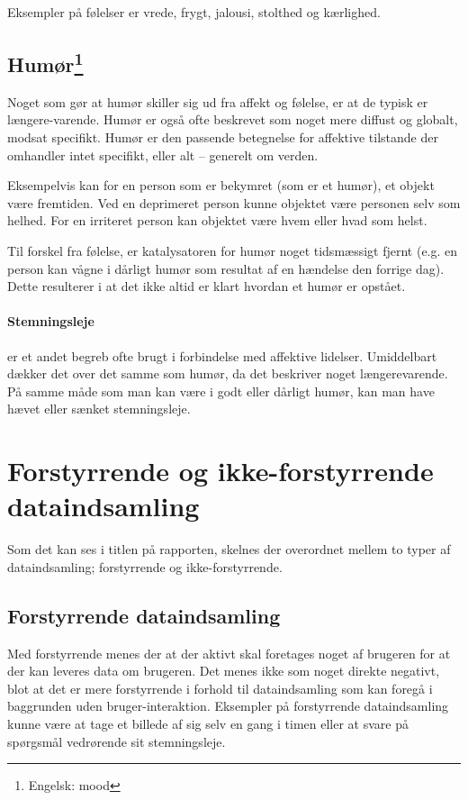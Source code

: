 Eksempler på følelser er vrede, frygt, jalousi, stolthed og kærlighed.\cite[p. 322]{ekkekakis}

\subsection[Humør]{Humør\footnote{Engelsk: mood}}
Noget som gør at humør skiller sig ud fra affekt og følelse, er at de typisk er længere-varende.
Humør er også ofte beskrevet som noget mere diffust og globalt, modsat specifikt.
Humør er den passende betegnelse for affektive tilstande der omhandler intet specifikt, eller alt -- generelt om verden.

Eksempelvis kan for en person som er bekymret (som er et humør), et objekt være fremtiden.
Ved en deprimeret person kunne objektet være personen selv som helhed.
For en irriteret person kan objektet være hvem eller hvad som helst.

Til forskel fra følelse, er katalysatoren for humør noget tidsmæssigt fjernt (e.g. en person kan vågne i dårligt humør som resultat af en hændelse den forrige dag).
Dette resulterer i at det ikke altid er klart hvordan et humør er opstået.\cite[p. 322]{ekkekakis}

\paragraph{Stemningsleje} er et andet begreb ofte brugt i forbindelse med affektive lidelser.
Umiddelbart dækker det over det samme som humør, da det beskriver noget længerevarende.
På samme måde som man kan være i godt eller dårligt humør, kan man have hævet eller sænket stemningsleje.

\section{Forstyrrende og ikke-forstyrrende dataindsamling}
Som det kan ses i titlen på rapporten, skelnes der overordnet mellem to typer af dataindsamling; forstyrrende og ikke-forstyrrende.

\subsection{Forstyrrende dataindsamling}\label{begreber::forstyrrende}
Med forstyrrende menes der at der aktivt skal foretages noget af brugeren for at der kan leveres data om brugeren.
Det menes ikke som noget direkte negativt, blot at det er mere forstyrrende i forhold til dataindsamling som kan foregå i baggrunden uden bruger-interaktion.
Eksempler på forstyrrende dataindsamling kunne være at tage et billede af sig selv en gang i timen eller at svare på spørgsmål vedrørende sit stemningsleje.

